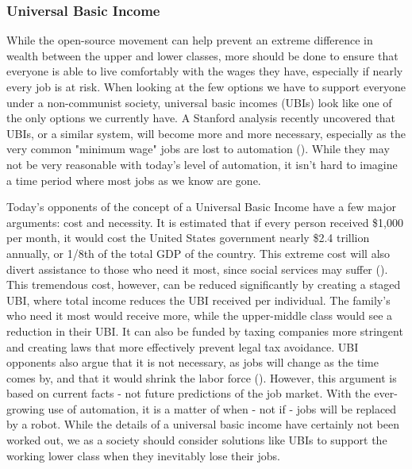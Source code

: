 \subsubsection{Universal Basic Income}

While the open-source movement can help prevent an extreme difference in wealth between the upper and lower classes, more should be done to ensure that everyone is able to live comfortably with the wages they have, especially if nearly every job is at risk. When looking at the few options we have to support everyone under a non-communist society, universal basic incomes (UBIs) look like one of the only options we currently have. A Stanford analysis recently uncovered that UBIs, or a similar system, will become more and more necessary, especially as the very common "minimum wage" jobs are lost to automation (\cite{StanfordUBI}). While they may not be very reasonable with today's level of automation, it isn't hard to imagine a time period where most jobs as we know are gone.

Today's opponents of the concept of a Universal Basic Income have a few major arguments: cost and necessity. It is estimated that if every person received \$1,000 per month, it would cost the United States government nearly \$2.4 trillion annually, or 1/8th of the total GDP of the country. This extreme cost will also divert assistance to those who need it most, since social services may suffer (\cite{UBI_WhyNot}). This tremendous cost, however, can be reduced significantly by creating a staged UBI, where total income reduces the UBI received per individual. The family's who need it most would receive more, while the upper-middle class would see a reduction in their UBI. It can also be funded by taxing companies more stringent and creating laws that more effectively prevent legal tax avoidance. UBI opponents also argue that it is not necessary, as jobs will change as the time comes by, and that it would shrink the labor force (\cite{UBI_WhyNot}). However, this argument is based on current facts - not future predictions of the job market. With the ever-growing use of automation, it is a matter of when - not if - jobs will be replaced by a robot. While the details of a universal basic income have certainly not been worked out, we as a society should consider solutions like UBIs to support the working lower class when they inevitably lose their jobs.
